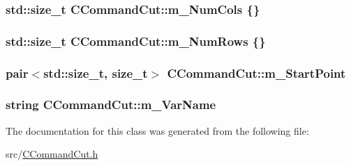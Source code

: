 \subsubsection[{\texorpdfstring{m\+\_\+\+Num\+Cols}{m_NumCols}}]{\setlength{\rightskip}{0pt plus 5cm}std\+::size\+\_\+t C\+Command\+Cut\+::m\+\_\+\+Num\+Cols \{\}\hspace{0.3cm}{\ttfamily [private]}}\hypertarget{classCCommandCut_a0073be24f9b9bfdb3a4194bd4ea16bbc}{}\label{classCCommandCut_a0073be24f9b9bfdb3a4194bd4ea16bbc}
\subsubsection[{\texorpdfstring{m\+\_\+\+Num\+Rows}{m_NumRows}}]{\setlength{\rightskip}{0pt plus 5cm}std\+::size\+\_\+t C\+Command\+Cut\+::m\+\_\+\+Num\+Rows \{\}\hspace{0.3cm}{\ttfamily [private]}}\hypertarget{classCCommandCut_ae1021a795aa0ca34697021ed9c68ea33}{}\label{classCCommandCut_ae1021a795aa0ca34697021ed9c68ea33}
\subsubsection[{\texorpdfstring{m\+\_\+\+Start\+Point}{m_StartPoint}}]{\setlength{\rightskip}{0pt plus 5cm}pair$<$std\+::size\+\_\+t, size\+\_\+t$>$ C\+Command\+Cut\+::m\+\_\+\+Start\+Point\hspace{0.3cm}{\ttfamily [private]}}\hypertarget{classCCommandCut_adbd994d2b9e2620042427235516b446b}{}\label{classCCommandCut_adbd994d2b9e2620042427235516b446b}
\subsubsection[{\texorpdfstring{m\+\_\+\+Var\+Name}{m_VarName}}]{\setlength{\rightskip}{0pt plus 5cm}string C\+Command\+Cut\+::m\+\_\+\+Var\+Name\hspace{0.3cm}{\ttfamily [private]}}\hypertarget{classCCommandCut_aeb69b9b4f3e1c319de83c2753294e2db}{}\label{classCCommandCut_aeb69b9b4f3e1c319de83c2753294e2db}


The documentation for this class was generated from the following file\+:\begin{DoxyCompactItemize}
\item 
src/\hyperlink{CCommandCut_8h}{C\+Command\+Cut.\+h}\end{DoxyCompactItemize}
